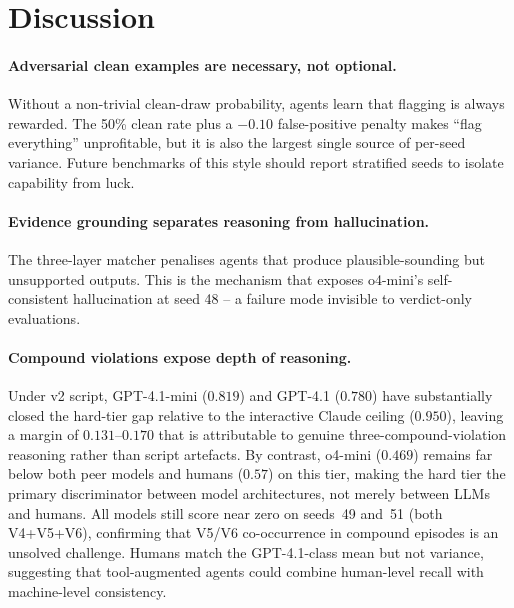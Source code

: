 \documentclass{article}
\begin{document}
\section{Discussion}
\label{sec:discussion}

\paragraph{Adversarial clean examples are necessary, not optional.}
Without a non-trivial clean-draw probability, agents learn that
flagging is always rewarded.  The 50\% clean rate plus a $-0.10$
false-positive penalty makes ``flag everything'' unprofitable, but it
is also the largest single source of per-seed variance.  Future
benchmarks of this style should report stratified seeds to isolate
capability from luck.

\paragraph{Evidence grounding separates reasoning from hallucination.}
The three-layer matcher penalises agents that produce plausible-sounding
but unsupported outputs.  This is the mechanism that exposes o4-mini's
self-consistent hallucination at seed 48 -- a failure mode invisible to
verdict-only evaluations.

\paragraph{Compound violations expose depth of reasoning.}
Under v2 script, GPT-4.1-mini ($0.819$) and GPT-4.1 ($0.780$) have
substantially closed the hard-tier gap relative to the interactive
Claude ceiling ($0.950$), leaving a margin of $0.131$--$0.170$ that
is attributable to genuine three-compound-violation reasoning rather
than script artefacts.  By contrast, o4-mini ($0.469$) remains far
below both peer models and humans ($0.57$) on this tier, making the
hard tier the primary discriminator between model architectures, not
merely between LLMs and humans.  All models still score near zero on
seeds~49 and~51 (both V4+V5+V6), confirming that V5/V6 co-occurrence
in compound episodes is an unsolved challenge.  Humans match the
GPT-4.1-class mean but not variance, suggesting that tool-augmented
agents could combine human-level recall with machine-level consistency.

\end{document}
